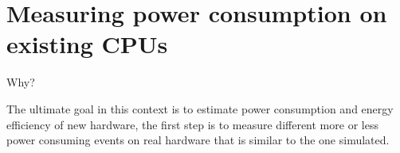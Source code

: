\section{Measuring power consumption on existing CPUs}
\cite{rundehvatum2013exploring}


Why?

The ultimate goal in this context is to estimate power consumption and energy efficiency
of new hardware, the first step is to measure different more or less power consuming events on
real hardware that is similar to the one simulated.


